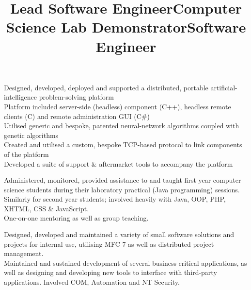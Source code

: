\documentclass{resume}
\begin{document}
\begin{resume}
\title{\bf Lead Software Engineer}
\begin{position}
Designed, developed, deployed and supported a distributed, portable artificial-intelligence problem-solving platform \vspace{1mm}\\
Platform included server-side (headless) component (C++), headless remote clients (C) and remote administration GUI (C\#) \vspace{1mm}\\
Utilised generic and bespoke, patented neural-network algorithms coupled with genetic algorithms\vspace{1mm}\\
Created and utilised a custom, bespoke TCP-based protocol to link components of the platform \vspace{1mm}\\
Developed a suite of support \& aftermarket tools to accompany the platform
\end{position}

\title{\bf Computer Science Lab Demonstrator}
\begin{position}
Administered, monitored, provided assistance to and taught first year computer science students during their laboratory practical (Java programming) sessions. \vspace{1mm}\\
Similarly for second year students; involved heavily with Java, OOP, PHP, XHTML, CSS \& JavaScript.\vspace{1mm}\\
One-on-one mentoring as well as group teaching.
\end{position}

\title{\bf Software Engineer}
\begin{position}
Designed, developed and maintained a variety of small software solutions and projects for internal use, utilising MFC 7 as well as distributed project management.  \vspace{1mm}\\
Maintained and sustained development of several business-critical applications, as well as designing and developing new tools to interface with third-party applications. Involved COM, Automation and NT Security.
\end{position}


\end{resume}
\end{document}
